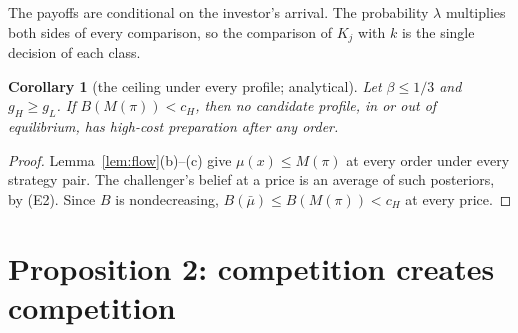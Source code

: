 \documentclass[11pt]{article}
\newtheorem{corollary}{Corollary}
\theoremstyle{definition}
\begin{document}
The payoffs are conditional on the investor's arrival. The probability $\lambda$ multiplies both sides of every
comparison, so the comparison of $K_j$ with $k$ is the single decision of each class.

\begin{corollary}[the ceiling under every profile; analytical]\label{cor:ceiling}
Let $\beta\le1/3$ and $g_H\ge g_L$. If $B(M(\pi))<c_H$, then no candidate profile, in or out of equilibrium,
has high-cost preparation after any order.
\end{corollary}

\begin{proof}
Lemma~\ref{lem:flow}(b)--(c) give $\mu(x)\le M(\pi)$ at every order under every strategy pair. The challenger's
belief at a price is an average of such posteriors, by (E2). Since $B$ is nondecreasing,
$B(\bar\mu)\le B(M(\pi))<c_H$ at every price.
\end{proof}

\section{Proposition 2: competition creates competition}\label{sec:prop2}
\end{document}
